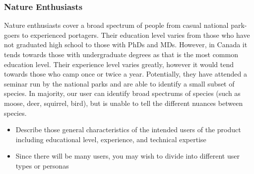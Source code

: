 \documentclass[]{article}
\begin{document}
\subsubsection{Nature Enthusiasts}
Nature enthusiasts cover a broad spectrum of people from casual national park-goers to experienced portagers. Their education level varies from those 
who have not graduated high school to those with PhDs and MDs. However, in Canada it tends towards those with undergraduate degrees as that is the most 
common education level. Their experience level varies greatly, however it would tend towards those who camp once or twice a year. Potentially, they have attended 
a seminar run by the national parks and are able to identify a small subset of species. In majority, our user can identify broad spectrums of species (such as moose,
deer, squirrel, bird), but is unable to tell the different nuances between species.
\begin{itemize}
	\item Describe those general characteristics of the intended users of the product including educational level, experience, and technical expertise 
	\item Since there will be many users, you may wish to divide into different user types or personas
\end{itemize}
\end{document}

